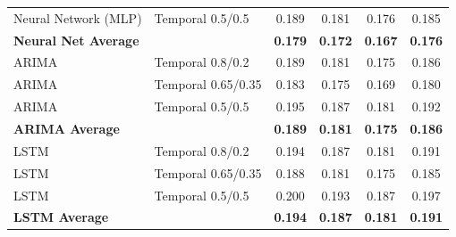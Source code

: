 \documentclass[11pt,a4paper]{article}
\begin{document}
\begin{table}[H]
\begin{tabular}{llcccc}
Neural Network (MLP) & Temporal 0.5/0.5 & 0.189 & 0.181 & 0.176 & 0.185 \\
\textbf{Neural Net Average} & & \textbf{0.179} & \textbf{0.172} & \textbf{0.167} & \textbf{0.176} \\
\midrule
ARIMA & Temporal 0.8/0.2 & 0.189 & 0.181 & 0.175 & 0.186 \\
ARIMA & Temporal 0.65/0.35 & 0.183 & 0.175 & 0.169 & 0.180 \\
ARIMA & Temporal 0.5/0.5 & 0.195 & 0.187 & 0.181 & 0.192 \\
\textbf{ARIMA Average} & & \textbf{0.189} & \textbf{0.181} & \textbf{0.175} & \textbf{0.186} \\
\midrule
LSTM & Temporal 0.8/0.2 & 0.194 & 0.187 & 0.181 & 0.191 \\
LSTM & Temporal 0.65/0.35 & 0.188 & 0.181 & 0.175 & 0.185 \\
LSTM & Temporal 0.5/0.5 & 0.200 & 0.193 & 0.187 & 0.197 \\
\textbf{LSTM Average} & & \textbf{0.194} & \textbf{0.187} & \textbf{0.181} & \textbf{0.191} \\
\bottomrule
\end{tabular}
\end{table}
\end{document}
